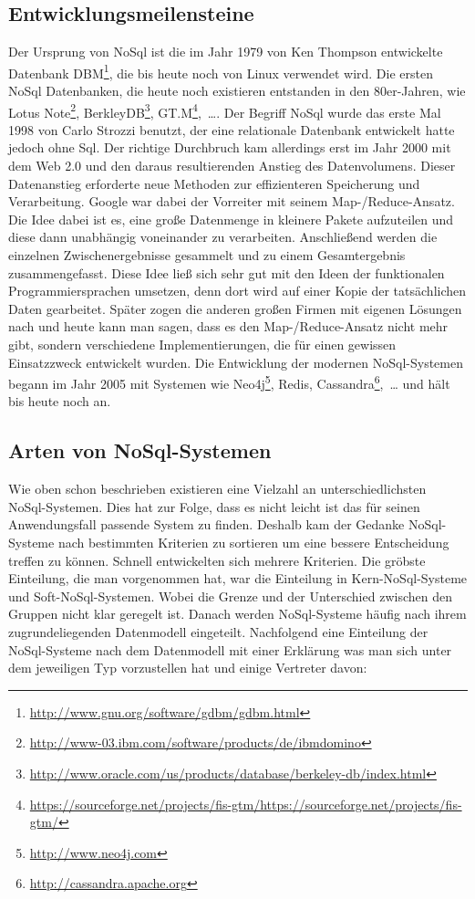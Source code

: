 \subsection{Entwicklungsmeilensteine}
Der Ursprung von NoSql ist die im Jahr 1979 von Ken Thompson entwickelte
Datenbank DBM\footnote{\url{http://www.gnu.org/software/gdbm/gdbm.html}}, die
bis heute noch von Linux verwendet wird. Die ersten NoSql Datenbanken, die
heute noch existieren entstanden in den 80er-Jahren, wie
Lotus Note\footnote{\url{http://www-03.ibm.com/software/products/de/ibmdomino}},
BerkleyDB\footnote{\url{http://www.oracle.com/us/products/database/berkeley-db/index.html}},
GT.M\footnote{\url{https://sourceforge.net/projects/fis-gtm/https://sourceforge.net/projects/fis-gtm/}},~\dots .
Der Begriff NoSql wurde das erste Mal 1998 von Carlo Strozzi benutzt, der eine
relationale Datenbank entwickelt hatte jedoch ohne Sql. Der richtige Durchbruch
kam allerdings erst im Jahr 2000 mit dem Web 2.0 und den daraus resultierenden
Anstieg des Datenvolumens. Dieser Datenanstieg erforderte neue Methoden zur
effizienteren Speicherung und Verarbeitung. Google war dabei der Vorreiter mit
seinem Map-/Reduce-Ansatz. Die Idee dabei ist es, eine große Datenmenge in
kleinere Pakete aufzuteilen und diese dann unabhängig voneinander zu verarbeiten.
Anschließend werden die einzelnen Zwischenergebnisse gesammelt und zu einem
Gesamtergebnis zusammengefasst. Diese Idee ließ sich sehr gut mit den Ideen
der funktionalen Programmiersprachen umsetzen, denn dort wird auf einer Kopie
der tatsächlichen Daten gearbeitet. Später zogen die anderen großen Firmen mit
eigenen Lösungen nach und heute kann man sagen, dass es den Map-/Reduce-Ansatz
nicht mehr gibt, sondern verschiedene Implementierungen, die für einen gewissen
Einsatzzweck entwickelt wurden. Die Entwicklung der modernen NoSql-Systemen
begann im Jahr 2005 mit Systemen wie Neo4j\footnote{\url{http://www.neo4j.com}},
Redis, Cassandra\footnote{\url{http://cassandra.apache.org}},~\dots{} und hält bis
heute noch an.

\subsection{Arten von NoSql-Systemen}
Wie oben schon beschrieben existieren eine Vielzahl an unterschiedlichsten
NoSql-Systemen. Dies hat zur Folge, dass es nicht leicht ist das für seinen
Anwendungsfall passende System zu finden. Deshalb kam der Gedanke NoSql-Systeme
nach bestimmten Kriterien zu sortieren um eine bessere Entscheidung treffen zu
können. Schnell entwickelten sich mehrere Kriterien. Die gröbste Einteilung,
die man vorgenommen hat, war die Einteilung in Kern-NoSql-Systeme und
Soft-NoSql-Systemen. Wobei die Grenze und der Unterschied zwischen den Gruppen
nicht klar geregelt ist. Danach werden NoSql-Systeme häufig nach ihrem
zugrundeliegenden Datenmodell eingeteilt. Nachfolgend eine Einteilung der
NoSql-Systeme nach dem Datenmodell mit einer Erklärung was man sich unter dem
jeweiligen Typ vorzustellen hat und einige Vertreter davon:

